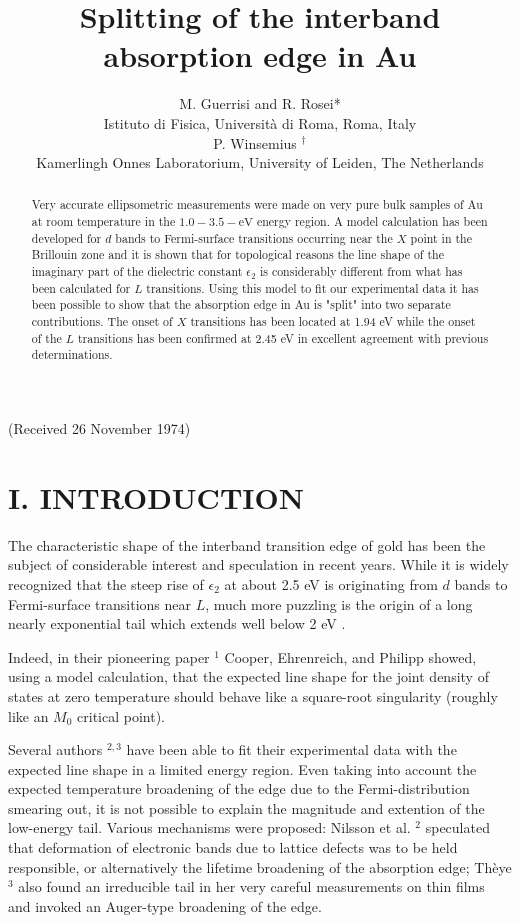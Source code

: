 \documentclass[10pt]{article}
\title{Splitting of the interband absorption edge in Au }
\author{M. Guerrisi and R. Rosei*\\
Istituto di Fisica, Università di Roma, Roma, Italy\\
P. Winsemius ${ }^{\dagger}$\\
Kamerlingh Onnes Laboratorium, University of Leiden, The Netherlands}
\date{}
\begin{document}
\maketitle
\captionsetup{singlelinecheck=false}
(Received 26 November 1974)

\begin{abstract}
Very accurate ellipsometric measurements were made on very pure bulk samples of Au at room temperature in the $1.0-3.5-\mathrm{eV}$ energy region. A model calculation has been developed for $d$ bands to Fermi-surface transitions occurring near the $X$ point in the Brillouin zone and it is shown that for topological reasons the line shape of the imaginary part of the dielectric constant $\epsilon_{2}$ is considerably different from what has been calculated for $L$ transitions. Using this model to fit our experimental data it has been possible to show that the absorption edge in Au is "split" into two separate contributions. The onset of $X$ transitions has been located at 1.94 eV while the onset of the $L$ transitions has been confirmed at 2.45 eV in excellent agreement with previous determinations.
\end{abstract}

\section*{I. INTRODUCTION}
The characteristic shape of the interband transition edge of gold has been the subject of considerable interest and speculation in recent years. While it is widely recognized that the steep rise of $\epsilon_{2}$ at about 2.5 eV is originating from $d$ bands to Fermi-surface transitions near $L$, much more puzzling is the origin of a long nearly exponential tail which extends well below 2 eV .

Indeed, in their pioneering paper ${ }^{1}$ Cooper, Ehrenreich, and Philipp showed, using a model calculation, that the expected line shape for the joint density of states at zero temperature should behave like a square-root singularity (roughly like an $M_{0}$ critical point).

Several authors ${ }^{2,3}$ have been able to fit their experimental data with the expected line shape in a limited energy region. Even taking into account the expected temperature broadening of the edge due to the Fermi-distribution smearing out, it is not possible to explain the magnitude and extention of the low-energy tail. Various mechanisms were proposed: Nilsson et al. ${ }^{2}$ speculated that deformation of electronic bands due to lattice defects was to be held responsible, or alternatively the lifetime broadening of the absorption edge; Thèye ${ }^{3}$ also found an irreducible tail in her very careful measurements on thin films and invoked an Auger-type broadening of the edge.
\end{document}
